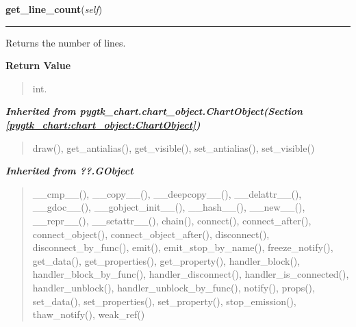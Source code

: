     \label{pygtk_chart:label:Label:get_line_count}

    \vspace{0.5ex}

\hspace{.8\funcindent}\begin{boxedminipage}{\funcwidth}

    \raggedright \textbf{get\_line\_count}(\textit{self})

    \vspace{-1.5ex}

    \rule{\textwidth}{0.5\fboxrule}
\setlength{\parskip}{2ex}
    Returns the number of lines.

\setlength{\parskip}{1ex}
      \textbf{Return Value}
    \vspace{-1ex}

      \begin{quote}
      int.

      \end{quote}

    \end{boxedminipage}


\large{\textbf{\textit{Inherited from pygtk\_chart.chart\_object.ChartObject\textit{(Section \ref{pygtk_chart:chart_object:ChartObject})}}}}

\begin{quote}
draw(), get\_antialias(), get\_visible(), set\_antialias(), set\_visible()
\end{quote}

\large{\textbf{\textit{Inherited from ??.GObject}}}

\begin{quote}
\_\_cmp\_\_(), \_\_copy\_\_(), \_\_deepcopy\_\_(), \_\_delattr\_\_(), \_\_gdoc\_\_(), \_\_gobject\_init\_\_(), \_\_hash\_\_(), \_\_new\_\_(), \_\_repr\_\_(), \_\_setattr\_\_(), chain(), connect(), connect\_after(), connect\_object(), connect\_object\_after(), disconnect(), disconnect\_by\_func(), emit(), emit\_stop\_by\_name(), freeze\_notify(), get\_data(), get\_properties(), get\_property(), handler\_block(), handler\_block\_by\_func(), handler\_disconnect(), handler\_is\_connected(), handler\_unblock(), handler\_unblock\_by\_func(), notify(), props(), set\_data(), set\_properties(), set\_property(), stop\_emission(), thaw\_notify(), weak\_ref()
\end{quote}

